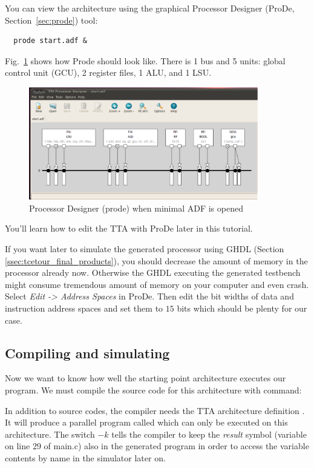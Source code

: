 \documentclass[twoside]{tceusermanual}
\begin{document}
You can view the architecture using the graphical Processor Designer
(ProDe, Section~\ref{sec:prode}) tool:

\begin{verbatim}
  prode start.adf &
\end{verbatim}

Fig.~\ref{fig:prode} shows how Prode should look like. There is 1 bus
and 5 units: global control unit (GCU), 2 register files, 1 ALU, and
1 LSU.
\begin{figure}
  \begin{center}
    \includegraphics[width=10cm]{eps/prode_scrshot}
    \caption{Processor Designer (prode) when minimal ADF is opened}
    \label{fig:prode}
  \end{center}
\end{figure}

You'll learn how to edit the TTA with ProDe later in this tutorial.

If you want later to simulate the generated processor using GHDL
(Section \ref{ssec:tcetour_final_products}), you should decrease the
amount of memory in the processor already now. Otherwise the GHDL
executing the generated testbench might consume tremendous amount of
memory on your computer and even crash. Select
\textit{Edit -> Address Spaces} in ProDe. Then edit the bit widths of
data and instruction address spaces and set them to $15$ bits which
should be plenty for our case.


\subsection{Compiling and simulating}
\label{ssec:eval_start}
Now we want to know how well the starting point architecture executes
our program. We must compile the source code for this architecture
with command:


In addition to source codes, the compiler needs the TTA architecture
definition . It will produce a parallel program called
 which can only be executed on this architecture. The
switch $-k$ tells the compiler to keep the \textit{result} symbol
(variable on line 29 of main.c) also in the generated program in order
to access the variable contents by name in the simulator later on.
\end{document}
